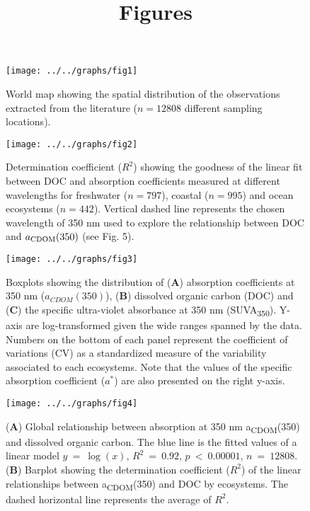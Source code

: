 \documentclass[12pt,a4paper]{scrartcl}
\title{Figures}
\date{}
\begin{document}
\maketitle

\begin{figure}[h]
	\centering
	\texttt{[image: ../../graphs/fig1]}
	\caption{World map showing the spatial distribution of the observations extracted from the literature ($n = 12808$ different sampling locations).}
\end{figure}

\clearpage
\newpage

\begin{figure}[h]
	\centering
	\texttt{[image: ../../graphs/fig2]}
	\caption{Determination coefficient ($R^2$) showing the goodness of the linear fit between DOC and absorption coefficients measured at different wavelengths for freshwater ($n = 797$), coastal ($n = 995$) and ocean ecosystems ($n = 442$). Vertical dashed line represents the chosen wavelength of 350 nm used to explore the relationship between DOC and $a\textsubscript{CDOM}(350)$ (see Fig. 5).}
\end{figure}

\clearpage
\newpage

\begin{figure}[h]
	\centering
	\texttt{[image: ../../graphs/fig3]}
	\caption{Boxplots showing the distribution of (\textbf{A}) absorption coefficients at 350 nm ($a_{CDOM}(350)$), (\textbf{B}) dissolved organic carbon (DOC) and (\textbf{C}) the specific ultra-violet absorbance at 350 nm (SUVA\textsubscript{350}). Y-axis are log-transformed given the wide ranges spanned by the data. Numbers on the bottom of each panel represent the coefficient of variations (CV) as a standardized measure of the variability associated to each ecosystems. Note that the values of the specific absorption coefficient ($a^*$) are also presented on the right y-axis.}
\end{figure}

\clearpage
\newpage

\begin{figure}[h]
	\centering
	\texttt{[image: ../../graphs/fig4]}
	\caption{(\textbf{A}) Global relationship between absorption at 350 nm a\textsubscript{CDOM}(350) and dissolved organic carbon. The blue line is the fitted values of a linear model $y~=~\log(x)$, $R^2~=~0.92$, $p~<~0.00001$, $n~=~12808$. (\textbf{B}) Barplot showing the determination coefficient ($R^2$) of the linear relationships between a\textsubscript{CDOM}(350) and DOC by ecosystems. The dashed horizontal line represents the average of $R^2$.}
\end{figure}
\end{document}
